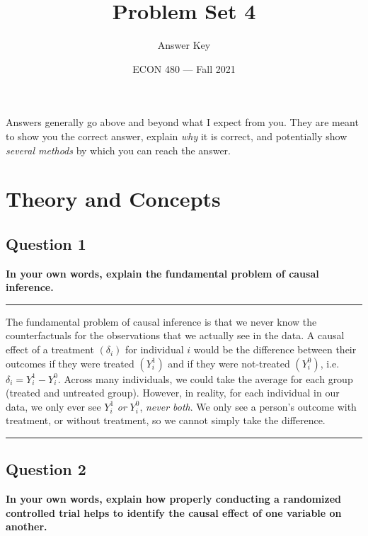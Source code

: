 \documentclass[
]{article}
\title{Problem Set 4}
\author{Answer Key}
\date{ECON 480 --- Fall 2021}
\begin{document}
\maketitle

Answers generally go above and beyond what I expect from you. They are
meant to show you the correct answer, explain \emph{why} it is correct,
and potentially show \emph{several methods} by which you can reach the
answer.

\hypertarget{theory-and-concepts}{%
\section{Theory and Concepts}\label{theory-and-concepts}}

\hypertarget{question-1}{%
\subsection{Question 1}\label{question-1}}

\textbf{In your own words, explain the fundamental problem of causal
inference.}

\begin{center}\rule{0.5\linewidth}{0.5pt}\end{center}

The fundamental problem of causal inference is that we never know the
counterfactuals for the observations that we actually see in the data. A
causal effect of a treatment \((\delta_i)\) for individual \(i\) would
be the difference between their outcomes if they were treated
\((Y^1_i)\) and if they were not-treated \((Y^0_i)\),
i.e.~\(\delta_i=Y^1_i-Y^0_i\). Across many individuals, we could take
the average for each group (treated and untreated group). However, in
reality, for each individual in our data, we only ever see \(Y^1_i\)
\emph{or} \(Y^0_i\), \emph{never both}. We only see a person's outcome
with treatment, or without treatment, so we cannot simply take the
difference.

\begin{center}\rule{0.5\linewidth}{0.5pt}\end{center}

\hypertarget{question-2}{%
\subsection{Question 2}\label{question-2}}

\textbf{In your own words, explain how properly conducting a randomized
controlled trial helps to identify the causal effect of one variable on
another.}
\end{document}
